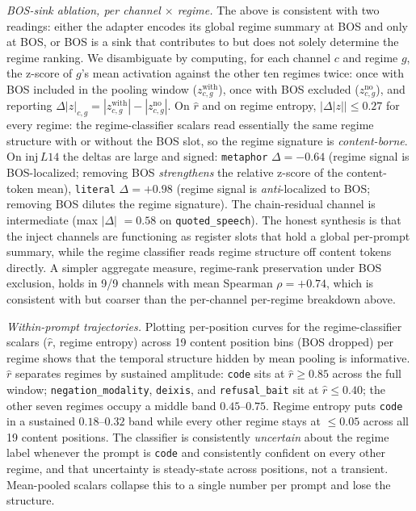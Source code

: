 \documentclass[
  11pt]{article}
\begin{document}
\emph{BOS-sink ablation, per channel \(\times\) regime.} The above is
consistent with two readings: either the adapter encodes its global
regime summary at BOS and only at BOS, or BOS is a sink that contributes
to but does not solely determine the regime ranking. We disambiguate by
computing, for each channel \(c\) and regime \(g\), the z-score of
\(g\)'s mean activation against the other ten regimes twice: once with
BOS included in the pooling window (\(z^{\text{with}}_{c,g}\)), once
with BOS excluded (\(z^{\text{no}}_{c,g}\)), and reporting
\(\Delta |z|_{c,g} = |z^{\text{with}}_{c,g}| - |z^{\text{no}}_{c,g}|\).
On \(\hat{r}\) and on regime entropy, \(|\Delta|z|| \leq 0.27\) for
every regime: the regime-classifier scalars read essentially the same
regime structure with or without the BOS slot, so the regime signature
is \emph{content-borne}. On \(\text{inj}\,L14\) the deltas are large and
signed: \texttt{metaphor} \(\Delta = -0.64\) (regime signal is
BOS-localized; removing BOS \emph{strengthens} the relative z-score of
the content-token mean), \texttt{literal} \(\Delta = +0.98\) (regime
signal is \emph{anti}-localized to BOS; removing BOS dilutes the regime
signature). The chain-residual channel is intermediate (max \(|\Delta|\)
\(= 0.58\) on \texttt{quoted\_speech}). The honest synthesis is that the
inject channels are functioning as register slots that hold a global
per-prompt summary, while the regime classifier reads regime structure
off content tokens directly. A simpler aggregate measure, regime-rank
preservation under BOS exclusion, holds in 9/9 channels with mean
Spearman \(\rho = +0.74\), which is consistent with but coarser than the
per-channel per-regime breakdown above.

\emph{Within-prompt trajectories.} Plotting per-position curves for the
regime-classifier scalars (\(\hat{r}\), regime entropy) across 19
content position bins (BOS dropped) per regime shows that the temporal
structure hidden by mean pooling is informative. \(\hat{r}\) separates
regimes by sustained amplitude: \texttt{code} sits at
\(\hat{r} \geq 0.85\) across the full window;
\texttt{negation\_modality}, \texttt{deixis}, and \texttt{refusal\_bait}
sit at \(\hat{r} \leq 0.40\); the other seven regimes occupy a middle
band \(0.45\)--\(0.75\). Regime entropy puts \texttt{code} in a
sustained \(0.18\)--\(0.32\) band while every other regime stays at
\(\leq 0.05\) across all 19 content positions. The classifier is
consistently \emph{uncertain} about the regime label whenever the prompt
is \texttt{code} and consistently confident on every other regime, and
that uncertainty is steady-state across positions, not a transient.
Mean-pooled scalars collapse this to a single number per prompt and lose
the structure.
\end{document}
